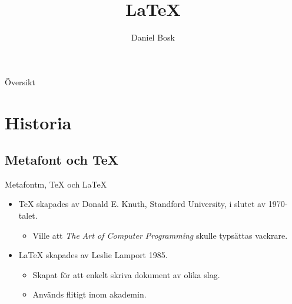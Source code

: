 \documentclass{beamer} %
\title{%
	\LaTeX
}
\author{Daniel Bosk}
\institute[MIUN ITM]{%
	Institutionen för informationsteknologi och medier (ITM),\\
	Mittuniversitetet, Sundsvall.
}
\date{\svnId}
\begin{document}
\begin{frame}
  \titlepage
\end{frame}
\begin{frame}{Översikt}
	\tableofcontents%
\end{frame}

\section{Historia}

\subsection{Metafont och \TeX}
\begin{frame}{Metafontm, \TeX{} och \LaTeX}
	\begin{itemize}
		\item \TeX{} skapades av Donald E. Knuth, Standford University, i slutet av 
			1970-talet.
			\begin{itemize}
				\item Ville att \emph{The Art of Computer Programming} 
					\citep{Knuth1997tao} skulle typsättas vackrare.
			\end{itemize}
		\item \LaTeX{} skapades av Leslie Lamport 1985.
			\begin{itemize}
				\item Skapat för att enkelt skriva dokument av olika slag.
				\item Används flitigt inom akademin.
			\end{itemize}
	\end{itemize}
\end{frame}
\end{document}
